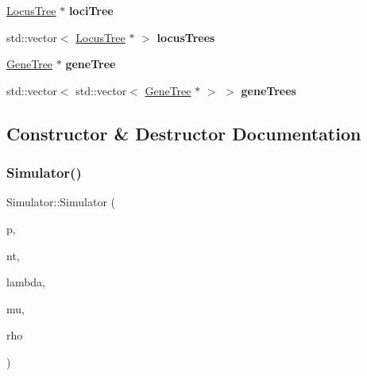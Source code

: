 \begin{DoxyCompactItemize}
\item 
\mbox{\label{class_simulator_a334b7cdcd14a2c20043cd2212eb83b2a}} 
\mbox{\hyperlink{class_locus_tree}{Locus\+Tree}} $\ast$ {\bfseries loci\+Tree}
\item 
\mbox{\label{class_simulator_af52bda62c9dfede2a9a2ab0e5cfe018e}} 
std\+::vector$<$ \mbox{\hyperlink{class_locus_tree}{Locus\+Tree}} $\ast$ $>$ {\bfseries locus\+Trees}
\item 
\mbox{\label{class_simulator_ab5e1926df85b2a47897cfc60216d96b0}} 
\mbox{\hyperlink{class_gene_tree}{Gene\+Tree}} $\ast$ {\bfseries gene\+Tree}
\item 
\mbox{\label{class_simulator_aeac23cc32472dae5e7d6485ca78368e6}} 
std\+::vector$<$ std\+::vector$<$ \mbox{\hyperlink{class_gene_tree}{Gene\+Tree}} $\ast$ $>$ $>$ {\bfseries gene\+Trees}
\end{DoxyCompactItemize}


\subsection{Constructor \& Destructor Documentation}
\mbox{\label{class_simulator_ad76f54c9f7089e19fa2e79749064a233}} 
\subsubsection{\texorpdfstring{Simulator()}{Simulator()}\hspace{0.1cm}{\footnotesize\ttfamily [1/3]}}
{\footnotesize\ttfamily Simulator\+::\+Simulator (\begin{DoxyParamCaption}\item[{\mbox{\hyperlink{class_mb_random}{Mb\+Random}} $\ast$}]{p,  }\item[{unsigned}]{nt,  }\item[{double}]{lambda,  }\item[{double}]{mu,  }\item[{double}]{rho }\end{DoxyParamCaption})}

